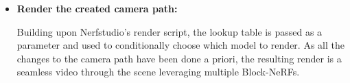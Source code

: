 \begin{itemize}
    \item \textbf{Render the created camera path:}

    Building upon Nerfstudio's render script, the lookup table is passed as a parameter and used to conditionally choose which model to render. As all the changes to the camera path have been done a priori, the resulting render is a seamless video through the scene leveraging multiple Block-NeRFs.
\end{itemize}



\begin{comment}
\begin{algorithmic}[1]
\Function{transform\_to\_single\_camera\_path}{}
    \State $block\_lookup$ \Comment{Lookup block to render at a certain c2w}
    \For{$c2w$ \textbf{in} $camera\_path$}
        \State $block \gets block\_lookup[c2w]$
        \State $t \gets block.dataparser\_transform["transform"]$
        \State $s \gets block.dataparser\_transform["scale"]$
        \State $new\_c2w \gets (t \times c2w) \times s$
        \State $camera \gets new\_c2w$
    \EndFor
\EndFunction
\end{algorithmic}


\begin{algorithmic}[1]
\Function{transform\_to\_single\_camera\_path}{$camera\_path\_path, block\_lookup, dataparser\_transform\_paths, export\_dir$}
    \State $original\_camera\_path \gets$ \Call{load\_json}{$camera\_path\_path$}
    \State $new\_camera\_path \gets$ \Call{copy.deepcopy}{$original\_camera\_path$}

    \For{$i \gets 0$ \textbf{to} $len(new\_camera\_path["camera\_path"]) - 1$}
        \State $block\_name \gets block\_lookup[str(i)]$
        \State $transform \gets$ \Call{load\_json}{$dataparser\_transform\_paths[block\_name]$}
        \State $t \gets$ \Call{np.array}{$transform["transform"]$}
        \State $s \gets transform["scale"]$

        \State $c2w \gets$ \Call{np.array}{$new\_camera\_path["camera\_path"][i]["camera\_to\_world"]$}.\Call{reshape}{4, 4}
        \State $c2w \gets (t \times c2w) \times s$
        \State $c2w \gets$ \Call{np.vstack}{($c2w$, \Call{np.array}{[0, 0, 0, 1]})}
        \State $new\_camera\_path["camera\_path"][i]["camera\_to\_world"] \gets c2w.\Call{reshape}{16}.\Call{tolist}{}$
    \EndFor
\EndFunction
\end{algorithmic}
\end{comment}

